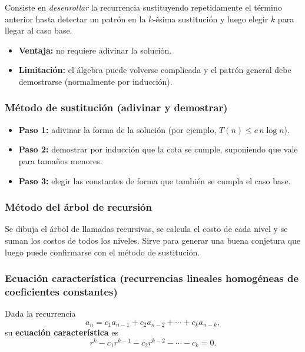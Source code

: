 \documentclass{article}
\begin{document}
        Consiste en \emph{desenrollar} la recurrencia sustituyendo repetidamente el
        término anterior hasta detectar un patrón en la $k$-ésima sustitución y luego
        elegir $k$ para llegar al caso base.
        
        \begin{itemize}
        \item \textbf{Ventaja:} no requiere adivinar la solución.
        \item \textbf{Limitación:} el álgebra puede volverse complicada y el patrón
                general debe demostrarse (normalmente por inducción).
        \end{itemize}
        
        \subsubsection{Método de sustitución (adivinar y demostrar)}
        
        \begin{itemize}
        \item \textbf{Paso 1:} adivinar la forma de la solución (por ejemplo,
                $T(n) \leq c\,n\log n$).
        \item \textbf{Paso 2:} demostrar por inducción que la cota se cumple,
                suponiendo que vale para tamaños menores.
        \item \textbf{Paso 3:} elegir las constantes de forma que también se cumpla
                el caso base.
        \end{itemize}
        
        \subsubsection{Método del árbol de recursión}
        
        Se dibuja el árbol de llamadas recursivas, se calcula el costo de cada nivel y
        se suman los costos de todos los niveles. Sirve para generar una buena
        conjetura que luego puede confirmarse con el método de sustitución.
        
        \subsubsection{Ecuación característica (recurrencias lineales homogéneas de coeficientes constantes)}
        
        Dada la recurrencia
        \[
        a_n = c_1 a_{n-1} + c_2 a_{n-2} + \cdots + c_k a_{n-k},
        \]
        su \textbf{ecuación característica} es
        \[
        r^k - c_1 r^{k-1} - c_2 r^{k-2} - \cdots - c_k = 0.
        \]
        
\end{document}
